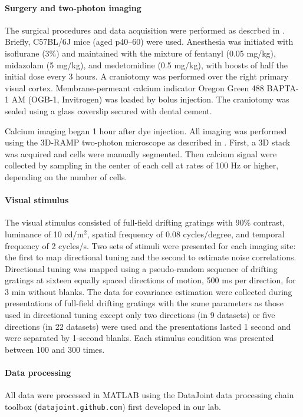 \documentclass[10pt]{article}
\begin{document}
\paragraph{Surgery and two-photon imaging}
The surgical procedures and data acquisition were performed as descrbed in \cite{Cotton:2013}. Briefly, C57BL/6J mice (aged p40--60) were used. Anesthesia was initiated with isoflurane (3\%) and maintained with the mixture of fentanyl (0.05 mg/kg), midazolam (5 mg/kg), and medetomidine (0.5 mg/kg), with boosts of half the initial dose every 3 hours.  A craniotomy was performed over the right primary visual cortex.  Membrane-permeant calcium indicator Oregon Green 488 BAPTA-1 AM (OGB-1, Invitrogen) was loaded by bolus injection.  The craniotomy was sealed using a glass coverslip secured with dental cement. 

Calcium imaging began 1 hour after dye injection.  All imaging was performed using the 3D-RAMP two-photon microscope as described in \cite{Cotton:2013}. First, a 3D stack was acquired and cells were manually segmented. Then calcium signal were collected by sampling in the center of each cell at rates of 100 Hz or higher, depending on the number of cells.

\paragraph{Visual stimulus}
The visual stimulus consisted of full-field drifting gratings with 90\% contrast, luminance of 10 cd/m$^2$, spatial frequency of 0.08 cycles/degree, and temporal frequency of 2 cycles/s. Two sets of stimuli were presented for each imaging site: the first to map directional tuning and the second to estimate noise correlations. Directional tuning was mapped using a pseudo-random sequence of drifting gratings at sixteen equally spaced directions of motion, 500 ms per direction, for 3 min without blanks. The data for covariance estimation were collected during presentations of full-field drifting gratings with the same parameters as those used in directional tuning except only two directions (in 9 datasets) or five directions (in 22 datasets) were used and the presentations lasted 1 second and were separated by 1-second blanks.  Each stimulus condition was presented between 100 and 300 times.
\paragraph{Data processing}
All data were processed in MATLAB using the DataJoint data processing chain toolbox ({\tt datajoint.github.com}) first developed in our lab. 
\end{document}
